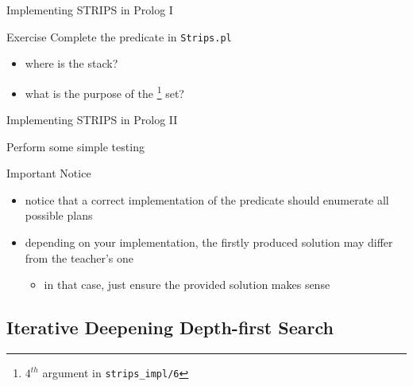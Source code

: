 \documentclass[presentation]{beamer}\mode<presentation>{\usetheme{AMSBolognaFC}}
\begin{document}
\begin{frame}[c]{Implementing STRIPS in Prolog I}
	
	\startExercise

    \begin{block}{Exercise \currentExercise}
        Complete the  predicate in \texttt{Strips.pl}
    \end{block}
	
    \begin{itemize}
        \item where is the stack?
        \item what is the purpose of the \footnote{$4^{th}$ argument in \texttt{strips\_impl/6}} set?
    \end{itemize}

\end{frame}

\begin{frame}[c]{Implementing STRIPS in Prolog II}

    \begin{exampleblock}{Perform some simple testing}
        
    \end{exampleblock}

    \vfill

    \begin{alertblock}{Important Notice}
        \begin{itemize}

            \item notice that a correct implementation of the  predicate should enumerate all possible plans

            \item depending on your implementation, the firstly produced solution may differ from the teacher's one
            \begin{itemize}
                \item in that case, just ensure the provided solution makes sense
            \end{itemize}
        \end{itemize}
    \end{alertblock}

\end{frame}

\subsection{Iterative Deepening Depth-first Search}
\end{document}
